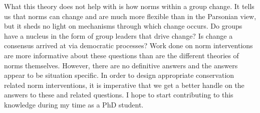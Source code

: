 \documentclass[rutwik_proposal.tex]{subfiles}
\begin{document}
What this theory does not help with is how norms within a group change. It tells us that norms can change and are much more flexible than in the Parsonian view, but it sheds no light on mechanisms through which change occurs. Do groups have a nucleus in the form of group leaders that drive change? Is change a consensus arrived at via democratic processes? Work done on norm interventions are more informative about these questions than are the different theories of norms themselves. However, there are no definitive answers and the answers appear to be situation specific. In order to design appropriate conservation related norm interventions, it is imperative that we get a better handle on the answers to these and related questions. I hope to start contributing to this knowledge during my time as a PhD student. 
\end{document}
